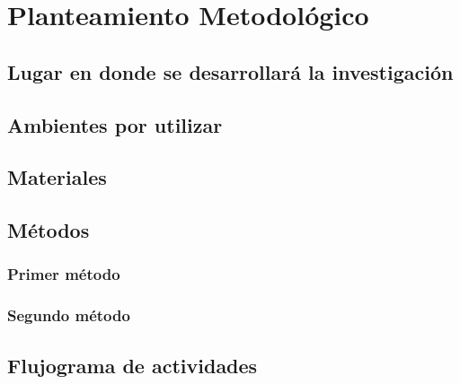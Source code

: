 \chapter{Planteamiento Metodológico}

\section{Lugar en donde se desarrollará la investigación}

\section{Ambientes por utilizar}

\section{Materiales}

\section{Métodos}

\subsection{Primer método}

\subsection{Segundo método}


\section{Flujograma de actividades }




